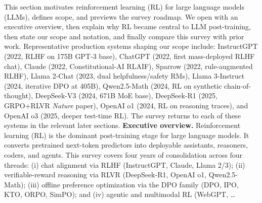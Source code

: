 This section motivates reinforcement learning (RL) for large language models (LLMs), defines scope, and previews the survey roadmap. We open with an executive overview, then explain why RL became central to LLM post-training, then state our scope and notation, and finally compare this survey with prior work. Representative production systems shaping our scope include: InstructGPT (2022, RLHF on 175B GPT-3 base), ChatGPT (2022, first mass-deployed RLHF chat), Claude (2022, Constitutional-AI RLAIF), Sparrow (2022, rule-augmented RLHF), Llama 2-Chat (2023, dual helpfulness/safety RMs), Llama 3-Instruct (2024, iterative DPO at 405B), Qwen2.5-Math (2024, RL on synthetic chain-of-thought), DeepSeek-V3 (2024, 671B MoE base), DeepSeek-R1 (2025, GRPO+RLVR \emph{Nature} paper), OpenAI o1 (2024, RL on reasoning traces), and OpenAI o3 (2025, deeper test-time RL). The survey returns to each of these systems in the relevant later sections. \textbf{Executive overview.} Reinforcement learning (RL) is the dominant post-training stage for large language models. It converts pretrained next-token predictors into deployable assistants, reasoners, coders, and agents. This survey covers four years of consolidation across four threads: (i) chat alignment via RLHF (InstructGPT, Claude, Llama 2/3); (ii) verifiable-reward reasoning via RLVR (DeepSeek-R1, OpenAI o1, Qwen2.5-Math); (iii) offline preference optimization via the DPO family (DPO, IPO, KTO, ORPO, SimPO); and (iv) agentic and multimodal RL (WebGPT, \ldots{}
